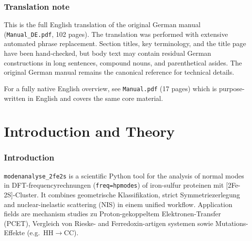 \documentclass[11pt,a4paper,twoside]{article}
\theoremstyle{remark}
\begin{document}
\tableofcontents
\clearpage

\section*{Translation note}

This is the full English translation of the original German manual
(\texttt{Manual\_DE.pdf}, 102 pages). The translation was performed
with extensive automated phrase replacement. Section titles, key
terminology, and the title page have been hand-checked, but body text
may contain residual German constructions in long sentences,
compound nouns, and parenthetical asides. The original German manual
remains the canonical reference for technical details.

For a fully native English overview, see \texttt{Manual.pdf}
(17 pages) which is purpose-written in English and covers the same
core material.

\clearpage

\part{Introduction and Theory}

\section{Introduction}
\label{sec:einleitung}

\texttt{modenanalyse\_2fe2s} is a scientific Python tool
for the analysis of normal modes in DFT-frequencyrechnungen
(\texttt{freq=hpmodes}) of iron-sulfur proteinen mit
{[}2Fe-2S{]}-Cluster. It combines geometrische Klassifikation,
strict Symmetriezerlegung and nuclear-inelastic scattering (NIS) in
einem unified workflow. Application fields are mechanism studies
zu Proton-gekoppeltem Elektronen-Transfer (PCET), Vergleich von
Rieske- and Ferredoxin-artigen systemen sowie Mutations-Effekte
(e.g.\ HH$\to$CC).
\end{document}
